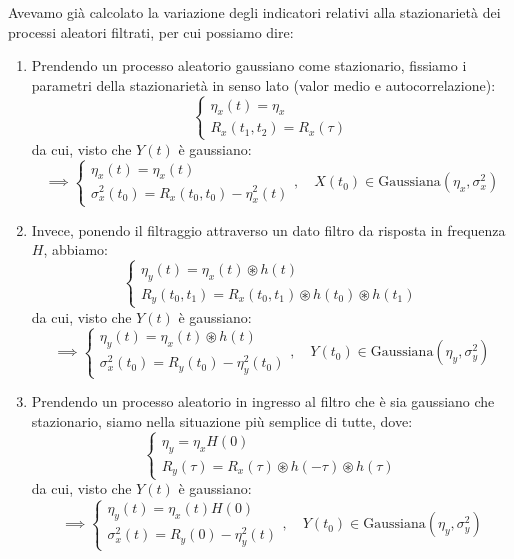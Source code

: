 \documentclass[a4paper,11pt]{article}
\begin{document}
Avevamo già calcolato la variazione degli indicatori relativi alla stazionarietà dei processi aleatori filtrati, per cui possiamo dire:
\begin{enumerate}
\item Prendendo un processo aleatorio gaussiano come stazionario, fissiamo i parametri della stazionarietà in senso lato (valor medio e autocorrelazione):
$$
\begin{cases}
\eta_x (t) = \eta_x \\
R_x(t_1, t_2) = R_x(\tau)
\end{cases}
$$
da cui, visto che $Y(t)$ è gaussiano:
$$
\implies \begin{cases}
\eta_x(t) = \eta_x(t) \\
\sigma_x^2(t_0) = R_x(t_0, t_0) - \eta_x^2(t)
\end{cases}, \quad
X(t_0) \in \mathrm{Gaussiana}\left( \eta_x, \sigma_x^2 \right)
$$
\item Invece, ponendo il filtraggio attraverso un dato filtro da risposta in frequenza $H$, abbiamo:
$$
\begin{cases}
\eta_y(t) = \eta_x(t) \circledast h(t) \\
R_y(t_0, t_1) = R_x(t_0, t_1) \circledast h(t_0) \circledast h(t_1) 
\end{cases}
$$
da cui, visto che $Y(t)$ è gaussiano:
$$
\implies \begin{cases}
\eta_y(t) = \eta_x(t) \circledast h(t) \\
\sigma_x^2(t_0) = R_y(t_0) - \eta_y^2(t_0) 
\end{cases}, \quad
Y(t_0) \in \mathrm{Gaussiana}\left( \eta_y, \sigma_y^2 \right)
$$
\item Prendendo un processo aleatorio in ingresso al filtro che è sia gaussiano che stazionario, siamo nella situazione più semplice di tutte, dove:
$$
\begin{cases}
\eta_y = \eta_x H(0) \\
R_y(\tau) = R_x(\tau) \circledast h(-\tau) \circledast h(\tau) 
\end{cases}
$$
da cui, visto che $Y(t)$ è gaussiano:
$$
\implies \begin{cases}
\eta_y(t) =  \eta_x(t) H(0) \\
\sigma_x^2(t) = R_y(0) - \eta_y^2(t)
\end{cases}, \quad
Y(t_0) \in \mathrm{Gaussiana}\left( \eta_y, \sigma_y^2 \right)
$$
\end{enumerate}
\end{document}
